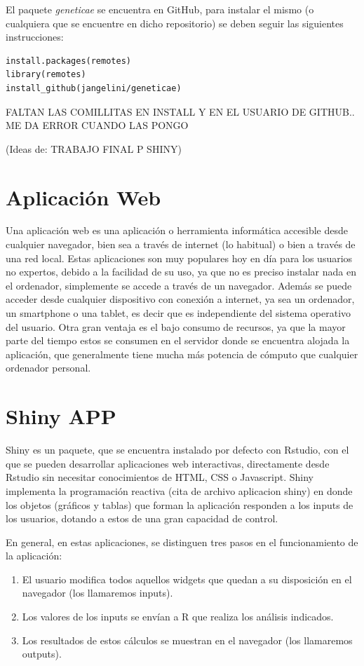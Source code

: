 El paquete \emph{geneticae} se encuentra en GitHub, para instalar el mismo (o cualquiera que se encuentre en dicho repositorio) se deben seguir las siguientes instrucciones:\\


\begin{lstlisting}[frame=single]
install.packages(remotes) 
library(remotes)
install_github(jangelini/geneticae) 
\end{lstlisting}


{\Huge{FALTAN LAS COMILLITAS EN INSTALL Y EN EL USUARIO DE GITHUB.. ME DA ERROR CUANDO LAS PONGO}}



{\Huge{(Ideas de: TRABAJO FINAL P SHINY)}}

\section{Aplicación Web}
Una aplicación web es una aplicación o herramienta informática accesible desde cualquier navegador, bien sea a través de internet (lo habitual) o bien a través de una red local. 
Estas aplicaciones son muy populares hoy en día para los usuarios no expertos, debido a la facilidad de su uso, ya que no es preciso instalar nada en el ordenador, simplemente se accede a través de un navegador. Además se puede acceder desde cualquier dispositivo con conexión a internet, ya sea un ordenador, un smartphone o una tablet, es decir que es independiente del sistema operativo del usuario. Otra gran ventaja es el bajo consumo de recursos, ya que la mayor parte del tiempo estos se consumen en el servidor donde se encuentra alojada la aplicación, que generalmente tiene mucha más potencia de cómputo que cualquier ordenador personal.

\section{Shiny APP}
Shiny es un paquete, que se encuentra instalado por defecto con Rstudio, con el que se pueden desarrollar aplicaciones web interactivas, directamente desde Rstudio sin necesitar conocimientos de HTML, CSS o Javascript. Shiny implementa la programación reactiva (cita de archivo aplicacion shiny) en donde los objetos (gráficos y tablas) que forman la aplicación responden a los inputs de los usuarios, dotando a estos de una gran capacidad de control.

En general, en estas aplicaciones, se distinguen tres pasos en el funcionamiento de la aplicación:
\begin{enumerate}
\item El usuario modifica todos aquellos widgets que quedan a su disposición en el navegador (los llamaremos inputs).
\item Los valores de los inputs se envían a R que realiza los análisis indicados.
\item Los resultados de estos cálculos se muestran en el navegador (los llamaremos outputs).
\end{enumerate}


